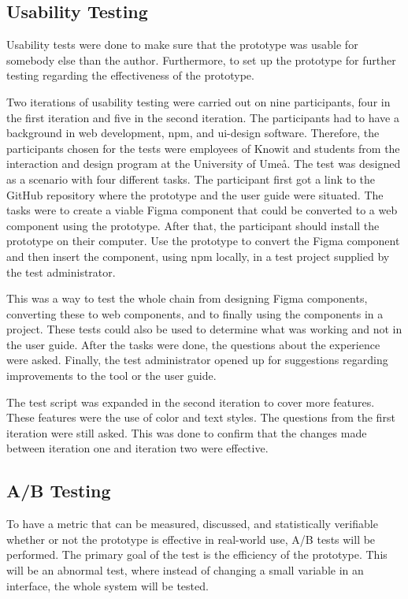 \subsection{Usability Testing}%
\label{sub:usertesting}
Usability tests were done to make sure that the prototype was usable for somebody else than the author. Furthermore, to set up the prototype for further testing regarding the effectiveness of the prototype.

Two iterations of usability testing were carried out on nine participants, four in the first iteration and five in the second iteration. The participants had to have a background in web development, \acrshort{npm}, and \acrshort{ui}-design software. Therefore, the participants chosen for the tests were employees of Knowit and students from the interaction and design program at the University of Umeå. The test was designed as a scenario with four different tasks. The participant first got a link to the GitHub repository where the prototype and the user guide were situated. The tasks were to create a viable Figma \gls{component} that could be converted to a web \gls{component} using the prototype. After that, the participant should install the prototype on their computer. Use the prototype to convert the Figma \gls{component} and then insert the \gls{component}, using \acrshort{npm} locally, in a test project supplied by the test administrator.

This was a way to test the whole chain from designing Figma \glspl{component}, converting these to web \glspl{component}, and to finally using the \glspl{component} in a project. These tests could also be used to determine what was working and not in the user guide. After the tasks were done, the questions about the experience were asked. Finally, the test administrator opened up for suggestions regarding improvements to the tool or the user guide. 

The test script was expanded in the second iteration to cover more features. These features were the use of color and text styles. The questions from the first iteration were still asked. This was done to confirm that the changes made between iteration one and iteration two were effective. 


\subsection{ A/B Testing }%
\label{sub:ab-testing}
To have a metric that can be measured, discussed, and statistically verifiable whether or not the prototype is effective in real-world use, A/B tests will be performed.  The primary goal of the test is the efficiency of the prototype. This will be an abnormal test, where instead of changing a small variable in an interface, the whole system will be tested. 

